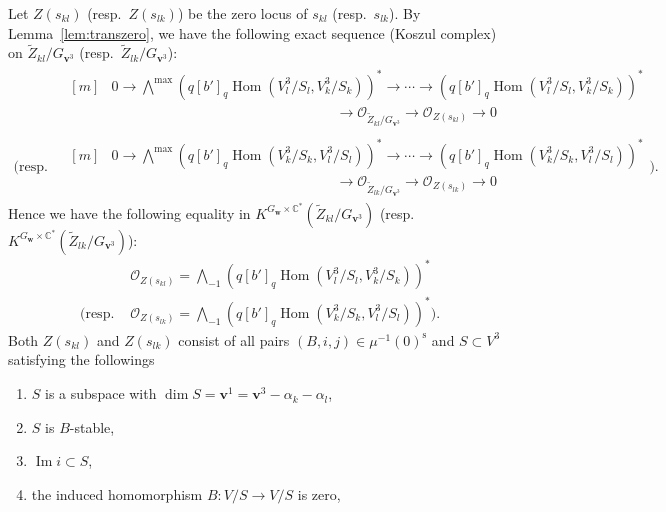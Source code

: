 \documentclass[12pt]{amsart}
\def\Bbb{\mathbb}
\renewcommand{\labelenumi}{(\theenumi)}%
\newenvironment{aenume}{%
  \begin{enumerate}%
  \renewcommand{\theenumi}{\alph{enumi}}%
  \renewcommand{\labelenumi}{(\theenumi)}%
  }{\end{enumerate}}
\theoremstyle{definition}
\theoremstyle{remark}
\numberwithin{equation}{subsection}
\newcommand{\lemref}[1]{Lemma~\ref{#1}}
\newcommand{\C}{{\Bbb C}}
\newcommand{\Hom}{\operatorname{Hom}}
\newcommand{\Ima}{\operatorname{Im}}
\newcommand{\bv}{{\mathbf v}} %
\newcommand{\bw}{{\mathbf w}} %
\newcommand{\shfO}{\mathcal O}
\newcommand{\Wedge}{{\textstyle \bigwedge}}
\begin{document}
Let $Z(s_{kl})$ (resp.\ $Z(s_{lk})$) be the zero locus of
$s_{kl}$ (resp.\ $s_{lk}$). By \lemref{lem:transzero}, we have the
following exact sequence (Koszul complex) on
$\widetilde Z_{kl}/G_{\bv^3}$ (resp.\ $\widetilde Z_{lk}/G_{\bv^3}$):
\begin{align*}
&
\begin{aligned}[m]
   & 0 \to \Wedge^{\max} (q [b']_q \Hom(V^3_l/S_l, V^3_k/S_k))^*
   \to \cdots
   \to (q [b']_q \Hom(V^3_l/S_l, V^3_k/S_k))^* \\
   & \qquad\qquad\qquad\qquad\qquad\qquad\qquad\qquad
   \to \shfO_{\widetilde Z_{kl}/G_{\bv^3}} \to
   \shfO_{Z(s_{kl})} \to 0
\end{aligned}
\\
\Biggl(\text{resp.\ }
&
\begin{aligned}[m]
   & 0 \to \Wedge^{\max} (q [b']_q \Hom(V^3_k/S_k, V^3_l/S_l))^*
   \to \cdots
   \to (q [b']_q \Hom(V^3_k/S_k, V^3_l/S_l))^* \\
   & \qquad\qquad\qquad\qquad\qquad\qquad\qquad\qquad
   \to \shfO_{\widetilde Z_{lk}/G_{\bv^3}} \to
   \shfO_{Z(s_{lk})} \to 0
\end{aligned}
\Biggr).
\end{align*}
Hence we have the following equality in
$K^{G_{\bw}\times\C^*}(\widetilde Z_{kl}/G_{\bv^3})$
(resp.\ $K^{G_{\bw}\times\C^*}(\widetilde Z_{lk}/G_{\bv^3})$):
\begin{equation*}
\begin{split}
   & \shfO_{Z(s_{kl})}
   = \Wedge_{-1} (q [b']_q \Hom(V^3_l/S_l, V^3_k/S_k))^*
\\
\Big(
\text{resp.\ }
   & \shfO_{Z(s_{lk})}
   = \Wedge_{-1} (q [b']_q \Hom(V^3_k/S_k, V^3_l/S_l))^* 
\Big).
\end{split}
\end{equation*}
Both $Z(s_{kl})$ and $Z(s_{lk})$ consist of all pairs
$(B,i,j)\in\mu^{-1}(0)^{\operatorname{s}}$ and
$S\subset V^3$ satisfying the followings
\begin{aenume}
\item $S$ is a subspace with $\dim S = \bv^1 = \bv^3 -
\alpha_k - \alpha_l$,
\item $S$ is $B$-stable,
\item $\Ima i \subset S$,
\item the induced homomorphism
$B\colon V/S \to V/S$ is zero,
\end{aenume}
\end{document}
